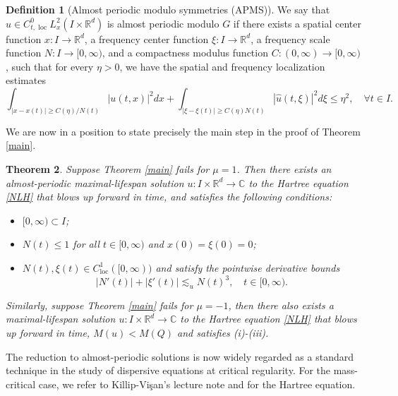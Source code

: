 \documentclass[reqno,11pt]{amsart}
\theoremstyle{plain}
\newtheorem{theorem}{Theorem}
\theoremstyle{definition}
\newtheorem{definition}[theorem]{Definition}
\numberwithin{equation}{section}
\numberwithin{theorem}{section}
\def\geq{\geqslant}
\def\leq{\leqslant}
\def\R{\mathbb{R}}
\begin{document}
\begin{definition}[Almost periodic modulo symmetries (APMS)]
We say that $u \in C_{t, \text { loc }}^0 L_x^2\left(I \times \R^d\right)$ is almost periodic modulo $G$ if there exists a spatial center function $x: I \rightarrow \R^d$, a frequency center function $\xi: I \rightarrow \R^d$, a frequency scale function $N: I \rightarrow[0, \infty)$, and a compactness modulus function $C:(0, \infty) \rightarrow[0, \infty)$, such that for every $\eta>0$, we have the spatial and frequency localization estimates
\begin{equation}\label{localized}
    \int_{|x-x(t)| \geq C(\eta) / N(t)}|u(t, x)|^2 d x+\int_{|\xi-\xi(t)|\geq C(\eta) N(t)}|\hat{u}(t, \xi)|^2 d \xi \leq \eta^2, \quad \forall t \in I.
\end{equation}

\end{definition}


We are now in a position to state precisely the main step in the proof of Theorem \ref{main}.

\begin{theorem}\label{reduction}
Suppose Theorem \ref{main} fails for $\mu=1$. Then  there exists an almost-periodic maximal-lifespan solution $u: I \times \R^d \rightarrow \mathbb{C}$ to the Hartree equation \eqref{NLH} that blows up forward in time, and satisfies the following conditions:
\begin{itemize}
\item[\textup{(i)}]  $[0, \infty) \subset I$;
    
\item[\textup{(ii)}]  $N(t) \leq 1$ for all $t \in[0, \infty)$ and $x(0) = \xi(0) = 0$;
    
\item[\textup{(iii)}] $N(t), \xi(t) \in C_{\mathrm{loc}}^1([0, \infty))$ and satisfy the pointwise derivative bounds
\begin{equation}\label{xxibound}
\left|N'(t)\right| + \left|\xi'(t)\right| \lesssim_u N(t)^3, \quad t \in [0, \infty).
\end{equation}
\end{itemize}
Similarly, suppose Theorem \ref{main} fails for $\mu=-1$, then there also exists a maximal-lifespan solution $u: I \times \R^d \rightarrow \mathbb{C}$ to the Hartree equation \eqref{NLH} that blows up forward  in time, $M(u)<M(Q)$ and satisfies \textup{(i)-(iii)}.
\end{theorem}

The reduction to almost-periodic solutions is now widely regarded as a standard technique in the study of dispersive equations at critical regularity. For the mass-critical case, we refer to Killip-Vi\c{s}an's lecture note \cite{KV} and \cite{MXZ-JMPA} for the  Hartree equation.
\end{document}
